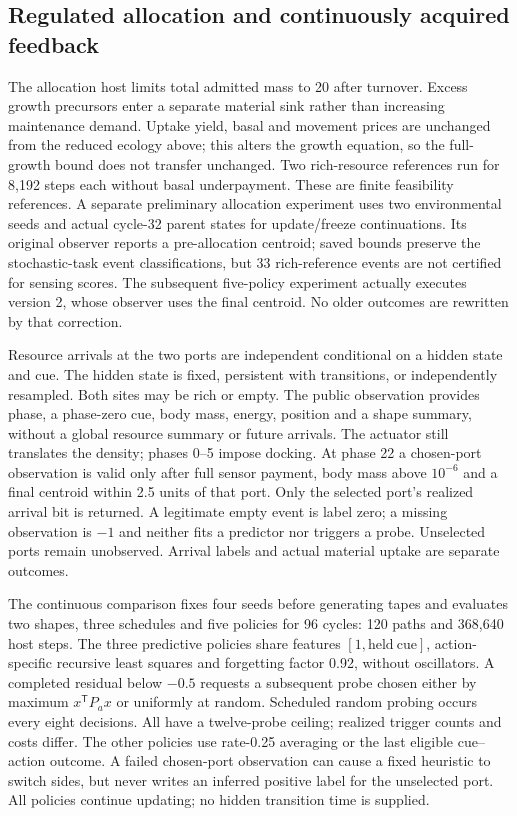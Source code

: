 \subsection*{Regulated allocation and continuously acquired feedback}
The allocation host limits total admitted mass to 20 after turnover. Excess growth precursors enter a separate material sink rather than increasing maintenance demand. Uptake yield, basal and movement prices are unchanged from the reduced ecology above; this alters the growth equation, so the full-growth bound does not transfer unchanged. Two rich-resource references run for 8,192 steps each without basal underpayment. These are finite feasibility references. A separate preliminary allocation experiment uses two environmental seeds and actual cycle-32 parent states for update/freeze continuations. Its original observer reports a pre-allocation centroid; saved bounds preserve the stochastic-task event classifications, but 33 rich-reference events are not certified for sensing scores. The subsequent five-policy experiment actually executes version 2, whose observer uses the final centroid. No older outcomes are rewritten by that correction.

Resource arrivals at the two ports are independent conditional on a hidden state and cue. The hidden state is fixed, persistent with transitions, or independently resampled. Both sites may be rich or empty. The public observation provides phase, a phase-zero cue, body mass, energy, position and a shape summary, without a global resource summary or future arrivals. The actuator still translates the density; phases 0--5 impose docking. At phase 22 a chosen-port observation is valid only after full sensor payment, body mass above $10^{-6}$ and a final centroid within 2.5 units of that port. Only the selected port's realized arrival bit is returned. A legitimate empty event is label zero; a missing observation is $-1$ and neither fits a predictor nor triggers a probe. Unselected ports remain unobserved. Arrival labels and actual material uptake are separate outcomes.

The continuous comparison fixes four seeds before generating tapes and evaluates two shapes, three schedules and five policies for 96 cycles: 120 paths and 368,640 host steps. The three predictive policies share features $[1,\mathrm{held\ cue}]$, action-specific recursive least squares and forgetting factor 0.92, without oscillators. A completed residual below $-0.5$ requests a subsequent probe chosen either by maximum $x^\mathsf{T}P_a x$ or uniformly at random. Scheduled random probing occurs every eight decisions. All have a twelve-probe ceiling; realized trigger counts and costs differ. The other policies use rate-0.25 averaging or the last eligible cue--action outcome. A failed chosen-port observation can cause a fixed heuristic to switch sides, but never writes an inferred positive label for the unselected port. All policies continue updating; no hidden transition time is supplied.

